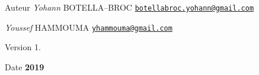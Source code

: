 \begin{DoxyAuthor}{Auteur}
{\itshape Yohann} B\+O\+T\+E\+L\+LA--B\+R\+OC \href{mailto:botellabroc.yohann@gmail.com}{\tt botellabroc.\+yohann@gmail.\+com} 

{\itshape Youssef} H\+A\+M\+M\+O\+U\+MA \href{mailto:yhammouma@gmail.com}{\tt yhammouma@gmail.\+com} 
\end{DoxyAuthor}
\begin{DoxyVersion}{Version}
1. 
\end{DoxyVersion}
\begin{DoxyDate}{Date}
{\bfseries 2019} 
\end{DoxyDate}
